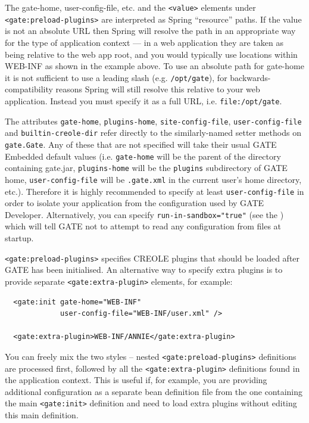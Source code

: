 The gate-home, user-config-file, etc. and the \verb|<value>| elements under
\verb|<gate:preload-plugins>| are interpreted as Spring ``resource'' paths.  If
the value is not an absolute URL then Spring will resolve the path in an
appropriate way for the type of application context --- in a web application
they are taken as being relative to the web app root, and you would typically
use locations within WEB-INF as shown in the example above.  To use an absolute
path for gate-home it is not sufficient to use a leading slash (e.g.
\verb|/opt/gate|), for backwards-compatibility reasons Spring will still
resolve this relative to your web application.  Instead you must specify it as
a full URL, i.e. \verb|file:/opt/gate|.

The attributes \verb|gate-home|, \verb|plugins-home|, \verb|site-config-file|,
\verb|user-config-file| and \verb|builtin-creole-dir| refer directly to the
similarly-named setter methods on \verb|gate.Gate|.  Any of these that are not
specified will take their usual GATE Embedded default values (i.e.
\verb|gate-home| will be the parent of the directory containing gate.jar,
\verb|plugins-home| will be the \verb|plugins| subdirectory of GATE home,
\verb|user-config-file| will be \verb|.gate.xml| in the current user's home
directory, etc.).  Therefore it is highly recommended to specify at least
\verb|user-config-file| in order to isolate your application from the
configuration used by GATE Developer.  Alternatively, you can specify
\verb|run-in-sandbox="true"| (see the
)
which will tell GATE not to attempt to read any configuration from files at
startup.

\verb|<gate:preload-plugins>| specifies CREOLE plugins that should be loaded
after GATE has been initialised.  An alternative way to specify extra plugins
is to provide separate \verb|<gate:extra-plugin>| elements, for example:
\begin{small}\begin{verbatim}
  <gate:init gate-home="WEB-INF"
             user-config-file="WEB-INF/user.xml" />

  <gate:extra-plugin>WEB-INF/ANNIE</gate:extra-plugin>
\end{verbatim}\end{small}
%
You can freely mix the two styles -- nested \verb|<gate:preload-plugins>|
definitions are processed first, followed by all the \verb|<gate:extra-plugin>|
definitions found in the application context.  This is useful if, for example,
you are providing additional configuration as a separate bean definition file
from the one containing the main \verb|<gate:init>| definition and need to load
extra plugins without editing this main definition.

